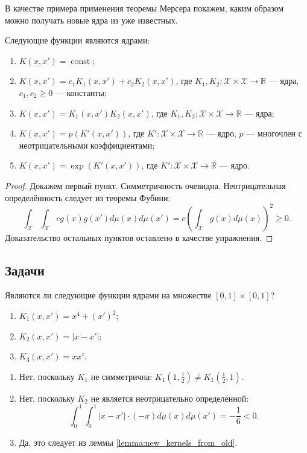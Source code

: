 В качестве примера применения теоремы Мерсера покажем, каким образом можно получать новые ядра из уже известных.

\begin{lemma}
\label{lemma:new_kernels_from_old}
Следующие функции являются ядрами:
\begin{enumerate}
    \item $K(x, x') = \operatorname{const}$;
    \item $K(x, x') = c_1 K_1(x, x') + c_2 K_2(x, x')$, где $K_1, K_2 \colon \mathcal{X} \times \mathcal{X} \to \mathbb{R}$ --- ядра, $c_1, c_2 \ge 0$ --- константы;
    \item $K(x, x') = K_1(x, x') K_2(x, x')$, где $K_1, K_2 \colon \mathcal{X} \times \mathcal{X} \to \mathbb{R}$ --- ядра;
    \item $K(x, x') = p(K'(x, x'))$, где $K' \colon \mathcal{X} \times \mathcal{X} \to \mathbb{R}$ --- ядро, $p$ --- многочлен с неотрицательными коэффициентами;
    \item $K(x, x') = \exp(K'(x, x'))$, где $K' \colon \mathcal{X} \times \mathcal{X} \to \mathbb{R}$ --- ядро.
\end{enumerate}
\end{lemma}
\begin{proof}
Докажем первый пункт. Симметричность очевидна. Неотрицательная определённость следует из теоремы Фубини:
\[ \int_\mathcal{X} \int_\mathcal{X} c g(x) g(x') d\mu(x) d\mu(x') = c \left( \int_\mathcal{X} g(x) d\mu(x) \right)^2 \ge 0. \]
Доказательство остальных пунктов оставлено в качестве упражнения.
\end{proof}

\subsection{Задачи}

\begin{problem}
Являются ли следующие функции ядрами на множестве $[0,1] \times [0,1]$?
\begin{enumerate}
    \item $K_1(x, x') = x^4 + (x')^2$;
    \item $K_2(x, x') = |x - x'|$;
    \item $K_3(x, x') = x x'$.
\end{enumerate}
\end{problem}
\begin{solution}
\begin{enumerate}
    \item Нет, поскольку $K_1$ не симметрична: $K_1\left(1, \frac{1}{2}\right) \ne K_1\left(\frac{1}{2}, 1\right)$.
    \item Нет, поскольку $K_2$ не является неотрицательно определённой:
    \[ \int_0^1 \int_0^1 |x - x'| \cdot (-x) d\mu(x) d\mu(x') = -\frac{1}{6} < 0. \]
    \item Да, это следует из леммы \ref{lemma:new_kernels_from_old}.
\end{enumerate}
\end{solution}

